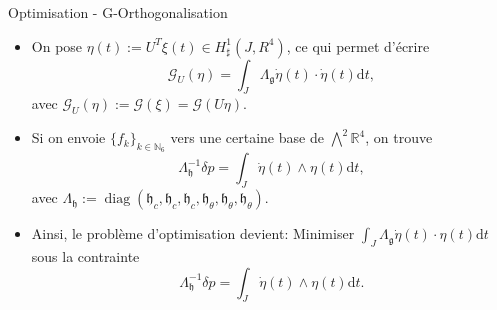 \documentclass[10pt, envcountsect]{beamer}
\theoremstyle{plain}
\newcommand{\N}{\mathbb{N}}
\newcommand{\R}{\mathbb{R}}
\DeclareMathOperator{\diag}{diag}
\newcommand{\dd}[1]{\mathrm{d}#1}
\begin{document}
\begin{frame}{Optimisation - G-Orthogonalisation}
\begin{itemize}
\item On pose $\eta(t) := U^T \xi(t) \in H^1_{\sharp}(J, R^4)$, ce qui permet d'écrire
\begin{equation}
\label{eq: G-orth energy functional}
\mathcal{G}_{U}(\eta) = \int_{J} \Lambda_{\mathfrak{g}} \dot{\eta}(t) \cdot \dot{\eta}(t) \dd t,
\end{equation}
avec $\mathcal{G}_{U}(\eta) := \mathcal{G}(\xi) = \mathcal{G}(U \eta)$.



\item Si on envoie $\{f_k\}_{k \in \N_6}$ vers une certaine base de $\bigwedge^2 \R^4$, on trouve
\begin{equation}
\label{eq: G-orth constraint}
\Lambda_{\mathfrak{h}}^{-1} \delta p = \int_{J} \dot{\eta}(t) \wedge\eta(t) \dd t,
\end{equation}
avec $\Lambda_{\mathfrak{h}} := \diag(\mathfrak{h}_{c}, \mathfrak{h}_{c}, \mathfrak{h}_{c}, \mathfrak{h}_{\theta}, \mathfrak{h}_{\theta}, \mathfrak{h}_{\theta})$.

\item Ainsi, le problème d'optimisation devient: Minimiser $ \int_{J}\Lambda_{\mathfrak{g}} \dot{\eta}(t) \cdot \eta(t) \dd t $ sous la contrainte 
\begin{equation}
\Lambda_{\mathfrak{h}}^{-1} \delta p = \int_{J} \dot{\eta}(t) \wedge\eta(t) \dd t.
\end{equation}
\end{itemize}
\end{frame}
\end{document}
